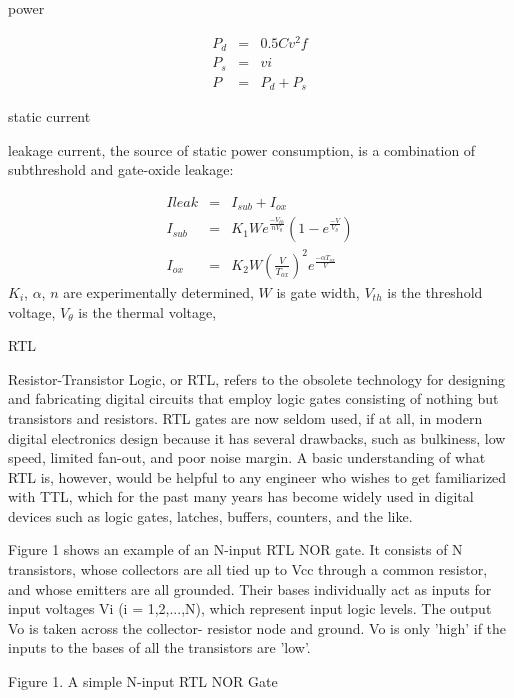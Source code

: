 power


\begin{eqnarray}
P_d &=& 0.5 C v^2 f\\
P_s &=& v i\\
P &=& P_d + P_s
\end{eqnarray}


static current

leakage current, the source of static power consumption, is a combination of subthreshold and gate-oxide leakage:

\begin{eqnarray}
Ileak &=& I_{sub} + I_{ox} \\
I_{sub} &=& K_1 W e^{\frac{-V_{th}}{nV_\theta}}\left(1-e^{\frac{-V}{V_\theta}}\right) \\ 
I_{ox} &=& K_2 W \left(\frac{V}{T_{ox}}\right)^2e^{\frac{-\alpha T_{ox}}{V}}
\end{eqnarray}
$K_i$, $\alpha$, $n$ are experimentally determined, 
$W$ is gate width, $V_{th}$ is the threshold voltage, $V_\theta$ is the thermal voltage, 




RTL



Resistor-Transistor Logic, or RTL, refers to the obsolete technology for designing and fabricating digital circuits that employ logic gates consisting of nothing but transistors and resistors.  RTL gates are now seldom used, if at all, in modern digital electronics design because it has several drawbacks, such as bulkiness, low speed, limited fan-out, and poor noise margin. A basic understanding of what RTL is, however, would be helpful to any engineer who wishes to get familiarized with TTL, which for the past many years has become widely used in digital devices such as logic gates, latches, buffers, counters, and the like.





Figure 1 shows an example of an N-input RTL NOR gate.  It consists of N transistors, whose collectors are all tied up to Vcc through a common resistor, and whose emitters are all grounded.  Their bases individually act as inputs for input voltages Vi (i = 1,2,...,N), which represent input logic levels.  The output Vo is taken across the collector- resistor node and ground.  Vo is only 'high' if the inputs to the bases of all the transistors are 'low'.





Figure 1.  A simple N-input RTL NOR Gate



